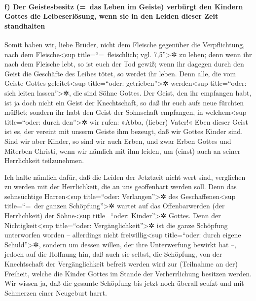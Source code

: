 \hypertarget{f-der-geistesbesitz-das-leben-im-geiste-verbuxfcrgt-den-kindern-gottes-die-leibeserluxf6sung-wenn-sie-in-den-leiden-dieser-zeit-standhalten}{%
\paragraph{f) Der Geistesbesitz (=~das Leben im Geiste) verbürgt den
Kindern Gottes die Leibeserlösung, wenn sie in den Leiden dieser Zeit
standhalten}\label{f-der-geistesbesitz-das-leben-im-geiste-verbuxfcrgt-den-kindern-gottes-die-leibeserluxf6sung-wenn-sie-in-den-leiden-dieser-zeit-standhalten}}

 Somit haben wir, liebe Brüder, nicht dem Fleische
gegenüber die Verpflichtung, nach dem Fleische\textless sup
title=``=~fleischlich; vgl. 7,5''\textgreater✲ zu leben; 
denn wenn ihr nach dem Fleische lebt, so ist euch der Tod gewiß; wenn
ihr dagegen durch den Geist die Geschäfte des Leibes tötet, so werdet
ihr leben.  Denn alle, die vom Geiste Gottes
geleitet\textless sup title=``oder: getrieben''\textgreater✲
werden\textless sup title=``oder: sich leiten lassen''\textgreater✲, die
sind Söhne Gottes.  Der Geist, den ihr empfangen habt,
ist ja doch nicht ein Geist der Knechtschaft, so daß ihr euch aufs neue
fürchten müßtet; sondern ihr habt den Geist der Sohnschaft empfangen, in
welchem\textless sup title=``oder: durch den''\textgreater✲ wir rufen:
»Abba, (lieber) Vater!«  Eben dieser Geist ist es, der
vereint mit unserm Geiste ihm bezeugt, daß wir Gottes Kinder sind.
 Sind wir aber Kinder, so sind wir auch Erben, und zwar
Erben Gottes und Miterben Christi, wenn wir nämlich mit ihm leiden, um
(einst) auch an seiner Herrlichkeit teilzunehmen.

 Ich halte nämlich dafür, daß die Leiden der Jetztzeit
nicht wert sind, verglichen zu werden mit der Herrlichkeit, die an uns
geoffenbart werden soll.  Denn das sehnsüchtige
Harren\textless sup title=``oder: Verlangen''\textgreater✲ des
Geschaffenen\textless sup title=``=~der ganzen Schöpfung''\textgreater✲
wartet auf das Offenbarwerden (der Herrlichkeit) der Söhne\textless sup
title=``oder: Kinder''\textgreater✲ Gottes.  Denn der
Nichtigkeit\textless sup title=``oder: Vergänglichkeit''\textgreater✲
ist die ganze Schöpfung unterworfen worden -- allerdings nicht
freiwillig\textless sup title=``oder: durch eigene
Schuld''\textgreater✲, sondern um dessen willen, der ihre Unterwerfung
bewirkt hat --, jedoch auf die Hoffnung hin,  daß auch
sie selbst, die Schöpfung, von der Knechtschaft der Vergänglichkeit
befreit werden wird zur (Teilnahme an der) Freiheit, welche die Kinder
Gottes im Stande der Verherrlichung besitzen werden.  Wir
wissen ja, daß die gesamte Schöpfung bis jetzt noch überall seufzt und
mit Schmerzen einer Neugeburt harrt.

